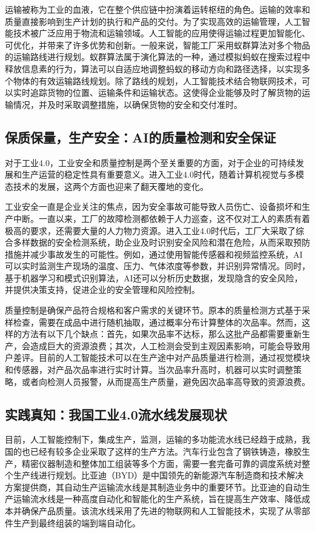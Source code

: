 运输被称为工业的血液，它在整个供应链中扮演着运转枢纽的角色。运输的效率和质量直接影响到生产计划的执行和产品的交付。为了实现高效的运输管理，人工智能技术被广泛应用于物流和运输领域。人工智能的应用使得运输过程更加智能化、可优化，并带来了许多优势和创新。一般来说，智能工厂采用蚁群算法对多个物品的运输路线进行规划。蚁群算法属于演化算法的一种，通过模拟蚂蚁在搜索过程中释放信息素的行为，算法可以自适应地调整蚂蚁的移动方向和路径选择，以实现多个物体的有效运输路线规划。除了路线的规划，人工智能技术结合物联网技术，可以实时追踪货物的位置、运输条件和运输状态。这使得企业能够及时了解货物的运输情况，并及时采取调整措施，以确保货物的安全和交付准时。

\subsection{保质保量，生产安全：AI的质量检测和安全保证}
对于工业4.0，工业安全和质量控制是两个至关重要的方面，对于企业的可持续发展和生产运营的稳定性具有重要意义。进入工业4.0时代，随着计算机视觉与多模态技术的发展，这两个方面也迎来了翻天覆地的变化。

工业安全一直是企业关注的焦点，因为安全事故可能导致人员伤亡、设备损坏和生产中断。一直以来，工厂的故障检测都依赖于人力巡查，这不仅对工人的素质有着极高的要求，还需要大量的人力物力资源。进入工业4.0时代后，工厂大采取了综合多样数据的安全检测系统，助企业及时识别安全风险和潜在危险，从而采取预防措施并减少事故发生的可能性。例如，通过使用智能传感器和视频监控系统，AI可以实时监测生产现场的温度、压力、气体浓度等参数，并识别异常情况。同时，基于机器学习和模式识别算法，AI还可以分析历史数据，发现隐含的安全风险，并提供决策支持，促进企业的安全管理和风险控制。

质量控制是确保产品符合规格和客户需求的关键环节。原本的质量检测方式基于采样检查，需要在成品中进行随机抽取，通过概率分布计算整体的次品率。然而，这样的方法有以下几个缺点：首先，如果次品率不达标，那么这批产品都需要重新生产，会造成巨大的资源浪费；其次，人工检测会受到主观因素影响，可能会导致用户差评。目前的人工智能技术可以在生产途中对产品质量进行检测，通过视觉模块和传感器，对产品次品率进行实时计算。当次品率升高时，机器可以实时调整策略，或者向检测人员报警，从而提高生产质量，避免因次品率高导致的资源浪费。 

\subsection{实践真知：我国工业4.0流水线发展现状}

目前，人工智能控制下，集成生产，监测，运输的多功能流水线已经趋于成熟，我国的也已经有较多企业采取了这样的生产方法。汽车行业包含了钢铁铸造，橡胶生产，精密仪器制造和整体加工组装等多个方面，需要一套完备可靠的调度系统对整个生产线进行规划。比亚迪（BYD）是中国领先的新能源汽车制造商和技术解决方案提供商，其自动生产运输流水线是其制造业务中的重要环节。比亚迪的自动生产运输流水线是一种高度自动化和智能化的生产系统，旨在提高生产效率、降低成本并确保产品质量。该流水线采用了先进的物联网和人工智能技术，实现了从零部件生产到最终组装的端到端自动化。

